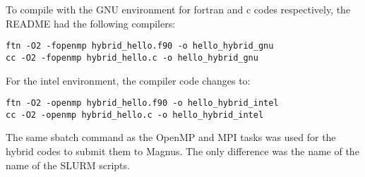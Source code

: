 To compile with the GNU environment for fortran and c codes respectively, the README had the following compilers:

\begin{strip}
\begin{tcolorbox}
\begin{verbatim}
ftn -O2 -fopenmp hybrid_hello.f90 -o hello_hybrid_gnu
cc -O2 -fopenmp hybrid_hello.c -o hello_hybrid_gnu
\end{verbatim}
\end{tcolorbox}
\end{strip}

For the intel environment, the compiler code changes to:

\begin{strip}
\begin{tcolorbox}
\begin{verbatim}
ftn -O2 -openmp hybrid_hello.f90 -o hello_hybrid_intel
cc -O2 -openmp hybrid_hello.c -o hello_hybrid_intel
\end{verbatim}
\end{tcolorbox}
\end{strip}

The same sbatch command as the OpenMP and MPI tasks was used for the hybrid codes to submit them to Magnus. The only difference was the name of the name
of the SLURM scripts.

